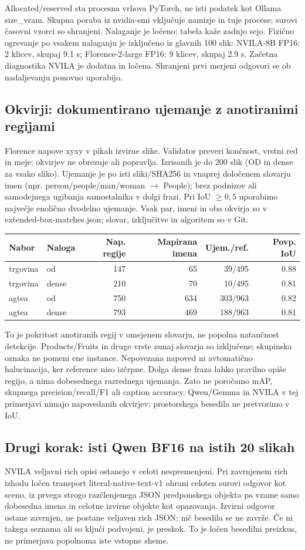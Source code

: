 \documentclass[10pt,a4paper]{article}
\begin{document}
Allocated/reserved sta procesna vrhova PyTorch, ne isti podatek kot Ollama size\_vram. Skupna poraba iz nvidia-smi vključuje namizje in tuje procese; surovi časovni vzorci so shranjeni. Nalaganje je ločeno; tabela kaže zadnjo sejo. Fizično ogrevanje po vsakem nalaganju je izključeno iz glavnih 100 slik: NVILA-8B FP16: 2 klicev, skupaj 9.1 s; Florence-2-large FP16: 9 klicev, skupaj 2.9 s. Začetna diagnostika NVILA je dodatna in ločena. Shranjeni prvi merjeni odgovori se ob nadaljevanju ponovno uporabijo.
\subsection*{Okvirji: dokumentirano ujemanje z anotiranimi regijami}
Florence napove xyxy v pikah izvirne slike. Validator preveri končnost, vrstni red in meje; okvirjev ne obrezuje ali popravlja. Izrisanih je do 200 slik (OD in dense za vsako sliko). Ujemanje je po isti sliki/SHA256 in vnaprej določenem slovarju imen (npr. person/people/man/woman $\rightarrow$ People); brez podnizov ali samodejnega ugibanja samostalnika v dolgi frazi. Pri IoU $\geq 0,5$ uporabimo največje enolično dvodelno ujemanje. Vsak par, imeni in oba okvirja so v extended-box-matches.json; slovar, izključitve in algoritem so v Git.
\begin{center}\small\begin{tabular}{p{2.1cm}p{1.5cm}rrrr}\toprule
Nabor & Naloga & Nap. regije & Mapirana imena & Ujem./ref. & Povp. IoU \\ \midrule
trgovina & od & 147 & 65 & 39/495 & 0.88 \\
trgovina & dense & 210 & 70 & 10/495 & 0.81 \\
agtea & od & 750 & 634 & 303/963 & 0.82 \\
agtea & dense & 793 & 469 & 188/963 & 0.81 \\
\bottomrule\end{tabular}\end{center}

To je pokritost anotiranih regij v omejenem slovarju, ne popolna natančnost detekcije. Products/Fruits in druge vrste zunaj slovarja so izključene; skupinska oznaka ne pomeni ene instance. Nepovezana napoved ni avtomatično halucinacija, ker reference niso izčrpne. Dolga dense fraza lahko pravilno opiše regijo, a nima dobesednega razrednega ujemanja. Zato ne poročamo mAP, skupnega precision/recall/F1 ali caption accuracy. Qwen/Gemma in NVILA v tej primerjavi nimajo napovedanih okvirjev; prostorskega besedila ne pretvorimo v IoU.
\subsection*{Drugi korak: isti Qwen BF16 na istih 20 slikah}
NVILA veljavni rich opisi ostanejo v celoti nespremenjeni. Pri zavrnjenem rich izhodu ločen transport literal-native-text-v1 ohrani celoten surovi odgovor kot sceno, iz prvega strogo razčlenjenega JSON predponskega objekta pa vzame samo dobesedna imena in celotne izvirne objekte kot opazovanja. Izvirni odgovor ostane zavrnjen, ne postane veljaven rich JSON; nič besedila se ne zavrže. Če ni takega seznama ali so ključi podvojeni, je preskok. To je ločen besedilni preizkus, ne primerjava popolnoma iste vstopne sheme.
\end{document}
